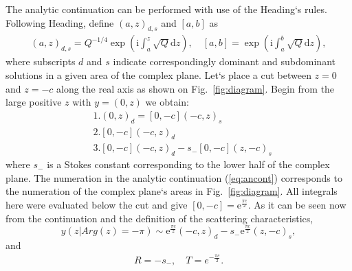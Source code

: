 \documentclass{ws-m3as}
\def\rmi{\mathrm{i}}
\def\rme{\mathrm{e}}
\def\rmd{\mathrm{d}}
\newcommand\eref[1]{(\ref{#1})}
\newcommand\fref[1]{Fig.~\ref{#1}}
\begin{document}
The analytic continuation can be performed with use of the Heading`s rules. 
Following Heading\cite{heading}, define $(a,z)_{d,s}$ and $[a,b]$ as
\begin{eqnarray}
(a,z)_{d,s} = Q^{-1/4}\exp \left( \rmi \int_a^z \sqrt{Q} \rmd z \right),
\quad
\left[a,b\right] = \exp \left( \rmi \int_a^b \sqrt{Q} \rmd z \right), 
\end{eqnarray}
where subscripts $d$ and $s$ indicate correspondingly dominant and subdominant solutions 
in a given area of the complex plane. Let`s place a cut between $z=0$ and $z=-c$ 
along the real axis as shown on \fref{fig:diagram}. Begin from the large positive $z$ 
with $y=(0,z)$ we obtain:
\begin{equation}
\begin{split} 
&1.(0,z)_d=[0,-c](-c,z)_s 
\\
&2.[0,-c](-c,z)_d 
\\
&3.[0,-c](-c,z)_d - s_-[0,-c](z,-c)_s
\label{eq:ancont}
\end{split}
\end{equation}
where $s_-$ is a Stokes constant corresponding to the lower half of the complex plane.
The numeration in the analytic continuation \eref{eq:ancont} corresponds to the
numeration of the complex plane`s areas in \fref{fig:diagram}.
All integrals here were evaluated below the cut and give $[0,-c]=\rme^{\frac{\pi c}{2}}$. As it
can be seen now from the continuation and the definition of the scattering characteristics,
\begin{equation}
y(z | Arg(z) = -\pi) \sim \rme^{\frac{\pi c}{2}}(-c,z)_d - s_-\rme^{\frac{\pi c}{2}}(z,-c)_s,
\end{equation}
and
\begin{eqnarray}
R = -s_-, \quad T = e^{-\frac{\pi c}{2}}.
\label{eq:scattr}
\end{eqnarray}
\end{document}
